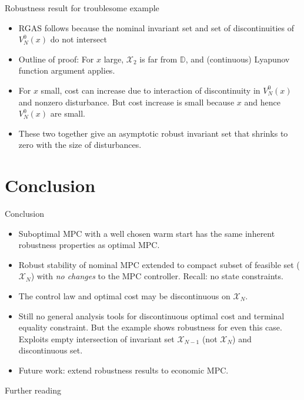 \documentclass{beamer}
\newcommand{\bbD}{\mathbb{D}}
\begin{document}
\begin{frame}{Robustness result for troublesome example}

\begin{block}{}
\begin{itemize}
\item RGAS follows because the nominal invariant set and set of
  discontinuities of $V_N^0(x)$ do not intersect

\item Outline of proof: For $x$ large, $\mathcal{X}_2$ is far from
  $\bbD$, and (continuous) Lyapunov function argument applies. 

\item For $x$ small, cost \alert{can increase} due to interaction of
  discontinuity in $V_N^0(x)$ and nonzero disturbance. But cost
  increase is small because $x$ and hence $V_N^0(x)$ are  small.

\item These two together give an asymptotic robust invariant set that shrinks to
  zero with the size of disturbances.
\end{itemize}
\end{block}

\end{frame}

\section{Conclusion}
\begin{frame}{Conclusion}

\begin{block}{}
\begin{itemize}
\item \alert{Suboptimal} MPC with a well chosen warm start has the same
  inherent robustness properties as \alert{optimal} MPC. \pause
\item Robust stability of nominal MPC extended to compact subset of
  feasible set ($\mathcal{X}_N$) with \textit{no changes} to the MPC
  controller. \pause 
  Recall:   no state constraints. \pause
\item The control law and optimal cost may be \alert{discontinuous} on
  $\mathcal{X}_N$. \pause 
\item Still no general analysis tools for discontinuous optimal cost
  and terminal \alert{equality constraint}.  But the example shows robustness
  for even this case. \pause Exploits \alert{empty} intersection of invariant set
  $\mathcal{X}_{N-1}$ (not $\mathcal{X}_N$) and discontinuous set. \pause
\item Future work: extend robustness results to \alert{economic} MPC.
\end{itemize}
\end{block}

\end{frame}

\begin{frame}{Further reading}

\renewcommand{\refname}{}
\scriptsize

%

\end{frame}
\end{document}
